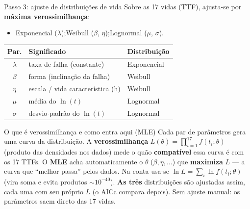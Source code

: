 \documentclass{beamer}
\begin{document}
\begin{frame}{Passo 3: ajuste de distribuições de vida}
    \footnotesize
    Sobre as 17 vidas (TTF), ajusta-se por \textbf{máxima verossimilhança}:
    \begin{itemize}\setlength{\itemsep}{1pt}
        \item Exponencial ($\lambda$);\quad Weibull ($\beta$, $\eta$);\quad Lognormal ($\mu$, $\sigma$).
    \end{itemize}
    \vspace{0.1cm}
    \footnotesize
    \begin{tabular}{cll}
        \toprule
        \textbf{Par.} & \textbf{Significado} & \textbf{Distribuição} \\
        \midrule
        $\lambda$ & taxa de falha (constante) & Exponencial \\
        $\beta$ & forma (inclinação da falha) & Weibull \\
        $\eta$ & escala / vida característica (h) & Weibull \\
        $\mu$ & média do $\ln(t)$ & Lognormal \\
        $\sigma$ & desvio-padrão do $\ln(t)$ & Lognormal \\
        \bottomrule
    \end{tabular}
    \normalsize
    \vspace{0.1cm}
    \begin{block}{O que é verossimilhança e como entra aqui (MLE)}
        \scriptsize Cada par de parâmetros gera uma curva da distribuição. A \textbf{verossimilhança} $L(\theta)=\prod_{i=1}^{17} f(t_i;\theta)$ (produto das densidades nos dados) mede o quão \textbf{compatível} essa curva é com os 17 TTFs. O \textbf{MLE} acha automaticamente o $\theta$ ($\beta,\eta,\dots$) que \textbf{maximiza} $L$ --- a curva que ``melhor passa'' pelos dados. Na conta usa-se $\ln L=\sum_i\ln f(t_i;\theta)$ (vira soma e evita produtos $\sim\!10^{-40}$). \textbf{As três} distribuições são ajustadas assim, cada uma com seu próprio $L$ (o AICc compara depois). Sem ajuste manual: os parâmetros saem direto das 17 vidas.
    \end{block}
\end{frame}
\end{document}
